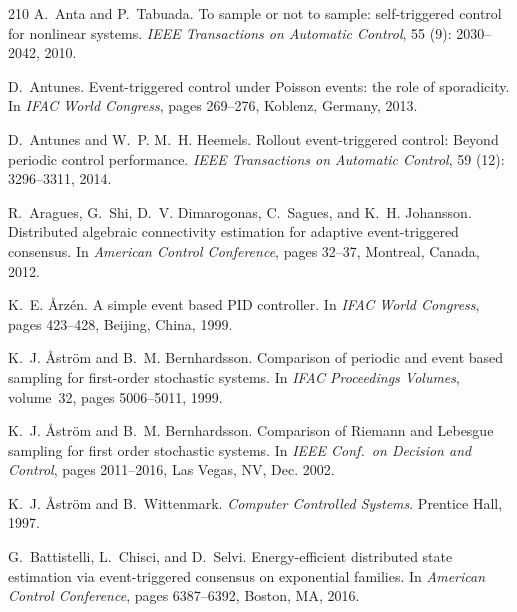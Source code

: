 \documentclass{autart}
\begin{document}
{\begin{thebibliography}{210}
A.~Anta and P.~Tabuada.
\newblock To sample or not to sample: self-triggered control for nonlinear
  systems.
\newblock \emph{IEEE Transactions on Automatic Control}, 55
  (9): 2030--2042, 2010.

D.~Antunes.
\newblock Event-triggered control under {P}oisson events: the role of
  sporadicity.
\newblock In \emph{{IFAC} {W}orld {C}ongress}, pages 269--276, Koblenz,
  Germany, 2013.

D.~Antunes and W.~P. M.~H. Heemels.
\newblock Rollout event-triggered control: Beyond periodic control performance.
\newblock \emph{IEEE Transactions on Automatic Control}, 59
  (12): 3296--3311, 2014.

R.~Aragues, G.~Shi, D.~V. Dimarogonas, C.~Sagues, and K.~H. Johansson.
\newblock Distributed algebraic connectivity estimation for adaptive
  event-triggered consensus.
\newblock In \emph{{A}merican {C}ontrol {C}onference}, pages 32--37, Montreal,
  Canada, 2012.

K.~E. {\r Arz\'en}.
\newblock A simple event based {PID} controller.
\newblock In \emph{{IFAC} {W}orld {C}ongress}, pages 423--428, Beijing, China,
  1999.

K.~J. {\r Astr{\"o}m} and B.~M. Bernhardsson.
\newblock Comparison of periodic and event based sampling for first-order
  stochastic systems.
\newblock In \emph{IFAC Proceedings Volumes}, volume~32, pages 5006--5011,
  1999.

K.~J. {\r Astr{\"o}m} and B.~M. Bernhardsson.
\newblock Comparison of {R}iemann and {L}ebesgue sampling for first order
  stochastic systems.
\newblock In \emph{{IEEE} Conf.\ on Decision and Control}, pages 2011--2016,
  Las Vegas, NV, Dec. 2002.

K.~J. {\r Astr{\"o}m} and B.~Wittenmark.
\newblock \emph{Computer Controlled Systems}.
\newblock Prentice Hall, 1997.

G.~Battistelli, L.~Chisci, and D.~Selvi.
\newblock Energy-efficient distributed state estimation via event-triggered
  consensus on exponential families.
\newblock In \emph{{A}merican {C}ontrol {C}onference}, pages 6387--6392,
  Boston, MA, 2016.


\end{thebibliography}}
\end{document}
